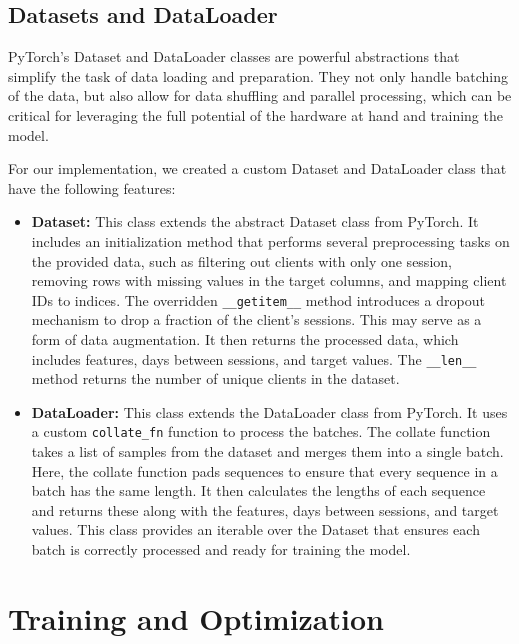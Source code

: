 \subsection{Datasets and DataLoader}

PyTorch's Dataset and DataLoader classes are powerful abstractions that
simplify the task of data loading and preparation. They not only handle
batching of the data, but also allow for data shuffling and parallel
processing, which can be critical for leveraging the full potential of the
hardware at hand and training the model.

For our implementation, we created a custom Dataset and DataLoader class that
have the following features:

\begin{itemize}
    \item \textbf{Dataset:} This class extends the abstract Dataset class from PyTorch.
          It includes an initialization method that performs several preprocessing
          tasks on the provided data, such as filtering out clients with only one
          session, removing rows with missing values in the target columns, and
          mapping client IDs to indices. The overridden \texttt{\_\_getitem\_\_} method
          introduces a dropout mechanism to drop a fraction of the client's sessions.
          This may serve as a form of data augmentation. It then returns the processed
          data, which includes features, days between sessions, and target values.
          The \texttt{\_\_len\_\_} method returns the number of unique clients in the dataset.

    \item \textbf{DataLoader:} This class extends the DataLoader class from PyTorch.
          It uses a custom \texttt{collate\_fn} function to process the batches.
          The collate function takes a list of samples from the dataset and merges
          them into a single batch. Here, the collate function pads sequences to
          ensure that every sequence in a batch has the same length. It then calculates
          the lengths of each sequence and returns these along with the features,
          days between sessions, and target values. This class provides an iterable
          over the Dataset that ensures each batch is correctly processed and ready
          for training the model.
\end{itemize}

\section{Training and Optimization}

